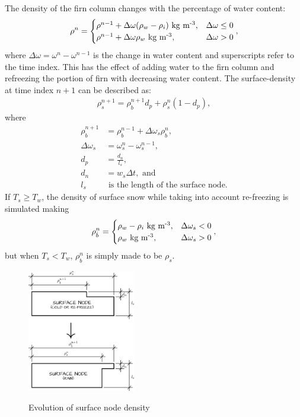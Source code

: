 \documentclass{article}%
\newcommand{\sups}[1]{\ensuremath{^{\textrm{#1}}}}
\begin{document}
The density of the firn column changes with the percentage of water content:
\begin{align*}
  \rho^n = 
  \begin{cases}
    \rho^{n-1} + \Delta\omega(\rho_w - \rho_i)\ \text{kg m\sups{-3}},  
      &\Delta\omega \leq 0\\
    \rho^{n-1} + \Delta\omega\rho_w\ \text{kg m\sups{-3}}, 
      &\Delta\omega > 0
  \end{cases},
\end{align*}
where $\Delta\omega = \omega^n - \omega^{n-1}$ is the change in water content and superscripts refer to the time index.  This has the effect of adding water to the firn column and refreezing the portion of firn with decreasing water content.  The surface-density at time index $n+1$ can be described as: 
\begin{align*}
  \rho_s^{n+1} = \rho_{\dot{b}}^{n+1} d_p + \rho_s^{n} (1 - d_p),
\end{align*}
where
\begin{align*}
  \rho_{\dot{b}}^{n+1} &= \rho_{\dot{b}}^{n-1} + \Delta \omega_s \rho_{\dot{b}}^n,\\
  \Delta \omega_s &= \omega_s^{n} - \omega_s^{n-1},\\
  d_p &= \frac{d_n}{l_s},\\
  d_n &= w_s\Delta t,\text{ and}\\
  l_s &\text{ is the length of the surface node.}
\end{align*}
If $T_s \geq T_w$, the density of surface snow while taking into account re-freezing is simulated making
\begin{align*}
  \rho_{\dot{b}}^n = 
  \begin{cases}
    \rho_w - \rho_i\ \text{kg m\sups{-3}},  &\Delta\omega_s < 0\\
    \rho_w\ \text{kg m\sups{-3}}, &\Delta\omega_s > 0\\
  \end{cases},
\end{align*}
but when $T_s < T_w$, $\rho_{\dot{b}}^n$ is simply made to be $\rho_s$.
\begin{figure}[H]
	\centering
		\includegraphics[width=0.42\textwidth]{images/surfaceDensity.png}
	\label{fig:500 year orbit}
	\caption{Evolution of surface node density}
\end{figure}
\end{document}
